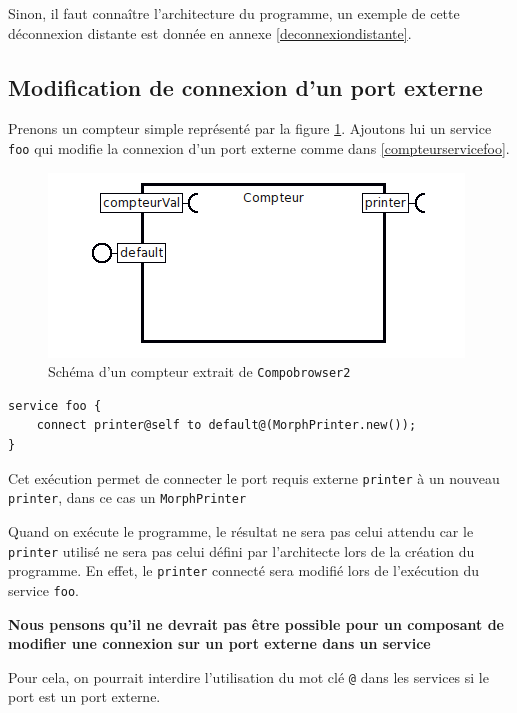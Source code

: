 \documentclass[11pt,a4paper,openany,oneside]{book}
\begin{document}
Sinon, il faut connaître l'architecture du programme, un exemple de cette déconnexion distante est donnée en annexe \ref{deconnexiondistante}.

\subsection{Modification de connexion d'un port externe}

Prenons un compteur simple représenté par la figure \ref{compteursimple}. Ajoutons lui un service \texttt{foo} qui modifie la connexion d'un port externe comme dans \ref{compteurservicefoo}.

\begin{figure}[H]
\centering
\includegraphics[scale=0.7, keepaspectratio=true]{compteursimple}
\caption{Schéma d'un compteur extrait de \texttt{Compobrowser2}}
\label{compteursimple}
\end{figure}

\begin{lstlisting}[language=Compo, frame=single, caption=Exemple d'un service dans un composant compteur,label=compteurservicefoo]
service foo {
    connect printer@self to default@(MorphPrinter.new());
}
\end{lstlisting}

Cet exécution permet de connecter le port requis externe \texttt{printer} à un nouveau \texttt{printer}, dans ce cas un \texttt{MorphPrinter}

Quand on exécute le programme, le résultat ne sera pas celui attendu car le \texttt{printer} utilisé ne sera pas celui défini par l'architecte lors de la création du programme. En effet, le \texttt{printer} connecté sera modifié lors de l'exécution du service \texttt{foo}.

\textbf{Nous pensons qu'il ne devrait pas être possible pour un composant de modifier une connexion sur un port externe dans un service}

Pour cela, on pourrait interdire l'utilisation du mot clé \texttt{@} dans les services si le port est un port externe.
\end{document}
